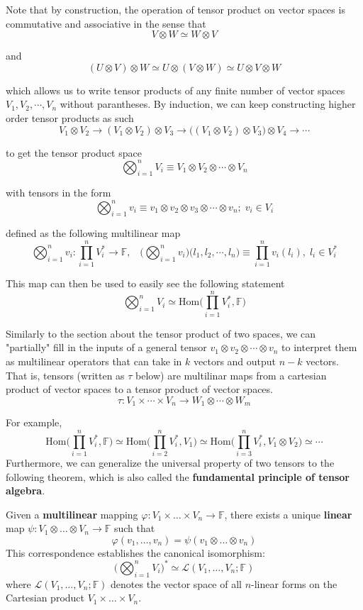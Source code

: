   Note that by construction, the operation of tensor product on vector spaces is commutative and associative in the sense that 
  \[V \otimes W \simeq W \otimes V\]

  and 
  \[(U \otimes V) \otimes W \simeq U \otimes (V \otimes W) \simeq U \otimes V \otimes W \]

  which allows us to write tensor products of any finite number of vector spaces $V_1, V_2, \cdots, V_n$ without parantheses. By induction, we can keep constructing higher order tensor products as such 
  \[V_1 \otimes V_2 \rightarrow (V_1 \otimes V_2) \otimes V_3 \rightarrow \big((V_1 \otimes V_2) \otimes V_3 \big) \otimes V_4 \rightarrow \cdots\]

  to get the tensor product space
  \[\bigotimes_{i=1}^{n} V_{i} \equiv V_1 \otimes V_2 \otimes \cdots \otimes V_n\]

  with tensors in the form 
  \[ \bigotimes_{i=1}^{n} v_{i} \equiv v_{1} \otimes v_{2} \otimes v_{3} \otimes \cdots \otimes v_{n}; \; v_{i} \in V_{i}\]

  defined as the following multilinear map 
  \[ \bigotimes_{i=1}^{n} v_{i}: \prod_{i=1}^{n} V_{i}^{*} \longrightarrow \mathbb{F}, \;\;\; \bigg( \bigotimes_{i=1}^{n} v_{i} \bigg) \big( l_{1}, l_{2}, \cdots, l_{n} \big) \equiv \prod_{i=1}^{n} v_{i}(l_{i}), \; l_i \in V_i^* \]

  This map can then be used to easily see the following statement
  \[\bigotimes_{i=1}^n V_i \simeq \text{Hom}\Big( \prod_{i=1}^n V_i^*, \mathbb{F} \Big)\]

  Similarly to the section about the tensor product of two spaces, we can "partially" fill in the inputs of a general tensor $v_1 \otimes v_2 \otimes \cdots \otimes v_n$ to interpret them as multilinear operators that can take in $k$ vectors and output $n-k$ vectors. That is, tensors (written as $\tau$ below) are multilinar maps from a cartesian product of vector spaces to a tensor product of vector spaces. 
  \[\tau: V_1 \times \cdots \times V_n \longrightarrow W_1 \otimes \cdots \otimes W_m \]

  For example, 
  \[\text{Hom}\Big( \prod_{i=1}^n V_i^*, \mathbb{F} \Big) \simeq 
  \text{Hom}\Big( \prod_{i=2}^n V_i^*, V_1 \Big) \simeq 
  \text{Hom}\Big( \prod_{i=3}^n V_i^*, V_1 \otimes V_2 \Big) \simeq \cdots \]
  Furthermore, we can generalize the universal property of two tensors to the following theorem, which is also called the \textbf{fundamental principle of tensor algebra}. 

  \begin{theorem}
    Given a \textbf{multilinear} mapping $\varphi: V_1 \times \dots \times V_n \longrightarrow \mathbb{F}$, there exists a unique \textbf{linear} map $\psi: V_1 \otimes \dots \otimes V_n \longrightarrow \mathbb{F}$ such that
    \[ \varphi(v_1, \dots, v_n) = \psi(v_1 \otimes \dots \otimes v_n) \]
    This correspondence establishes the canonical isomorphism:
    \[ \bigg( \bigotimes_{i=1}^n V_i \bigg)^* \simeq \mathcal{L}(V_1, \dots, V_n; \mathbb{F}) \]
    where $\mathcal{L}(V_1, \dots, V_n; \mathbb{F})$ denotes the vector space of all $n$-linear forms on the Cartesian product $V_1 \times \dots \times V_n$.
  \end{theorem}


